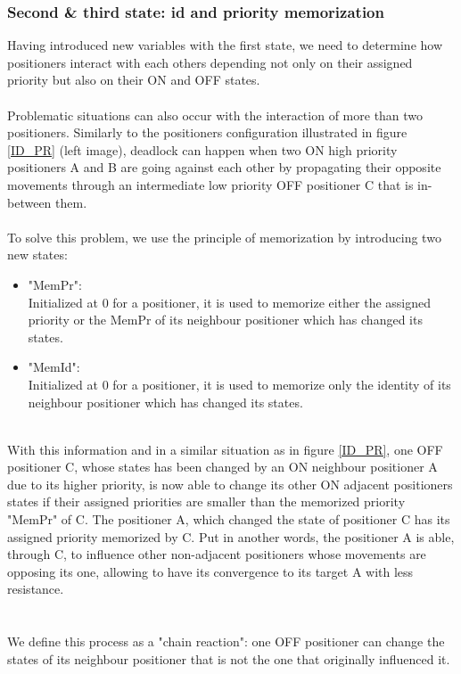 \documentclass[]{spie}  %
\begin{document}
	\subsubsection{Second \& third state: id and priority memorization}
	Having introduced new variables with the first state, we need to determine how positioners interact with each others depending not only on their assigned priority but also on their  ON and OFF states.\\\\
	Problematic situations can also occur with the interaction of more than two positioners. Similarly to the positioners configuration illustrated in figure \ref{ID_PR} (left image), deadlock can happen when two ON high priority positioners A and B are going against each other by propagating their opposite movements through an intermediate low priority OFF positioner C that is in-between them.\\\\
	To solve this problem, we use the principle of memorization by introducing two new states: 
	\begin{itemize}
		\item "MemPr":  \\
		Initialized at 0 for a positioner, it is used to memorize either the assigned priority or the MemPr of its neighbour positioner which has changed its  states.\\
		\item "MemId": \\
		Initialized at 0 for a positioner, it is used to memorize only the identity of its neighbour positioner which has changed its states.
	\end{itemize}\\
	  With this information and in a similar situation as in figure \ref{ID_PR}, one OFF positioner C, whose states has been changed by an ON neighbour positioner A due to its higher priority, is now able to change its other ON adjacent positioners states if their assigned priorities are smaller than the memorized priority "MemPr" of C. The positioner A, which changed the state of positioner C has its assigned priority memorized by C.  Put in another words, the positioner A is able, through C, to influence other non-adjacent positioners whose movements are opposing its one, allowing to have its convergence to its target A with less resistance.\\\\\\
	 We define this process as a "chain reaction": one OFF positioner can change the states of its neighbour positioner that is not the one that originally influenced it. \\
	 
\end{document}
